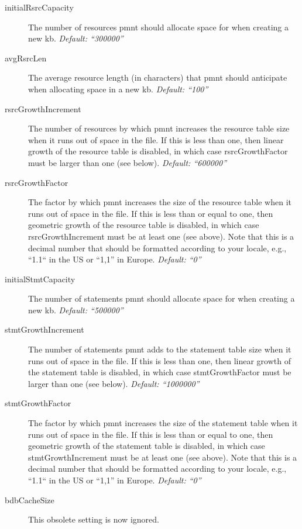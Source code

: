\begin{description}
	\item[initialRsrcCapacity] The number of resources \ac{pmnt} should allocate space for when creating a new \ac{kb}. \emph{Default: ``300000''}

	\item[avgRsrcLen] The average resource length (in characters) that \ac{pmnt} should anticipate when allocating space in a new \ac{kb}. \emph{Default: ``100''}

	\item[rsrcGrowthIncrement] The number of resources by which \ac{pmnt} increases the resource table size when it runs out of space in the file.  If this is less than one, then linear growth of the resource table is disabled, in which case rsrcGrowthFactor must be larger than one (see below). \emph{Default: ``600000''}

	\item[rsrcGrowthFactor] The factor by which \ac{pmnt} increases the size of the resource table when it runs out of space in the file.  If this is less than or equal to one, then geometric growth of the resource table is disabled, in which case rsrcGrowthIncrement must be at least one (see above).  Note that this is a decimal number that should be formatted according to your locale, e.g., ``1.1`` in the US or ``1,1'' in Europe. \emph{Default: ``0''}

	\item[initialStmtCapacity] The number of statements \ac{pmnt} should allocate space for when creating a new \ac{kb}. \emph{Default: ``500000''}

	\item[stmtGrowthIncrement] The number of statements \ac{pmnt} adds to the statement table size when it runs out of space in the file.  If this is less than one, then linear growth of the statement table is disabled, in which case stmtGrowthFactor must be larger than one (see below). \emph{Default: ``1000000''}

	\item[stmtGrowthFactor] The factor by which \ac{pmnt} increases the size of the statement table when it runs out of space in the file.  If this is less than or equal to one, then geometric growth of the statement table is disabled, in which case stmtGrowthIncrement must be at least one (see above).  Note that this is a decimal number that should be formatted according to your locale, e.g., ``1.1`` in the US or ``1,1'' in Europe. \emph{Default: ``0''}

	\item[bdbCacheSize] This obsolete setting is now ignored.


\end{description}
